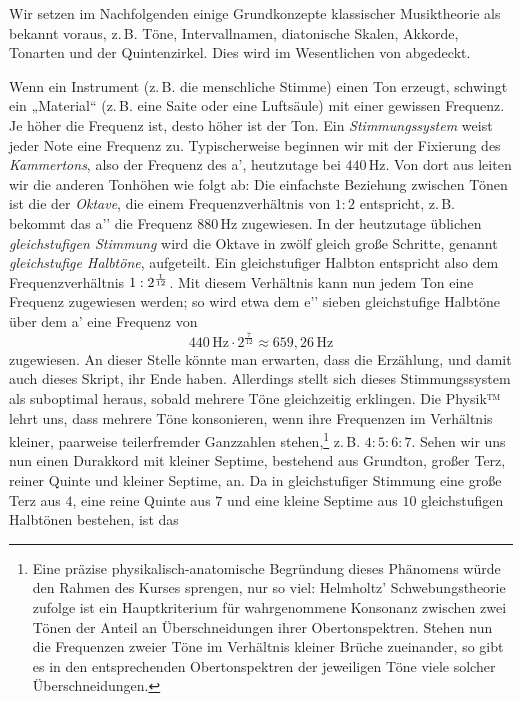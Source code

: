 Wir setzen im Nachfolgenden einige Grundkonzepte klassischer Musiktheorie als
bekannt voraus, z.\,B. Töne, Intervallnamen, diatonische Skalen, Akkorde,
Tonarten und der Quintenzirkel. Dies wird im Wesentlichen von
\cite[§\,1–6]{Skript} abgedeckt.

Wenn ein Instrument (z.\,B. die menschliche Stimme) einen Ton erzeugt, schwingt
ein „Material“ (z.\,B. eine Saite oder eine Luftsäule) mit einer gewissen
Frequenz.  Je höher die Frequenz ist, desto höher ist der Ton. Ein
\emph{Stimmungssystem} weist jeder Note eine Frequenz zu. Typischerweise
beginnen wir mit der Fixierung des \emph{Kammertons}, also der Frequenz des a’,
heutzutage bei $440$\,Hz. Von dort aus leiten wir die anderen Tonhöhen wie folgt
ab: Die einfachste Beziehung zwischen Tönen ist die der \emph{Oktave}, die einem
Frequenzverhältnis von $1:2$ entspricht, z.\,B. bekommt das a’’ die Frequenz
$880$\,Hz zugewiesen. In der heutzutage üblichen \emph{gleichstufigen Stimmung}
wird die Oktave in zwölf gleich große Schritte, genannt \emph{gleichstufige
  Halbtöne}, aufgeteilt. Ein gleichstufiger Halbton entspricht also dem
Frequenzverhältnis $1:2^{\smash{\frac1{12}}}$. Mit diesem Verhältnis kann nun
jedem Ton eine Frequenz zugewiesen werden; so wird etwa dem e’’ sieben
gleichstufige Halbtöne über dem a’ eine Frequenz von 
\[440\,\text{Hz}\cdot 2^{\frac7{12}} \approx 659{,}26\,\text{Hz}\]%
zugewiesen.  An dieser Stelle könnte man erwarten, dass die Erzählung, und damit
auch dieses Skript, ihr Ende haben. Allerdings stellt sich dieses
Stimmungssystem als suboptimal heraus, sobald mehrere Töne gleichzeitig
erklingen. Die Physik™ lehrt uns, dass mehrere Töne konsonieren, wenn ihre
Frequenzen im Verhältnis kleiner, paarweise teilerfremder Ganzzahlen
stehen,\footnote{Eine präzise physikalisch-anatomische Begründung dieses
  Phänomens würde den Rahmen des Kurses sprengen, nur so viel: Helmholtz’
  Schwebungstheorie \cite[§\,10–12]{HE} zufolge ist ein Hauptkriterium für
  wahrgenommene Konsonanz zwischen zwei Tönen der Anteil an Überschneidungen
  ihrer Obertonspektren. Stehen nun die Frequenzen zweier Töne im Verhältnis
  kleiner Brüche zueinander, so gibt es in den entsprechenden Obertonspektren
  der jeweiligen Töne viele solcher Überschneidungen.\vspace*{.4px}}
z.\,B. $4:5:6:7$. Sehen wir uns nun einen Durakkord mit kleiner Septime,
bestehend aus Grundton, großer Terz, reiner Quinte und kleiner Septime, an. Da
in gleichstufiger Stimmung eine große Terz aus $4$, eine reine Quinte aus $7$
und eine kleine Septime aus $10$ gleichstufigen Halbtönen bestehen, ist das
